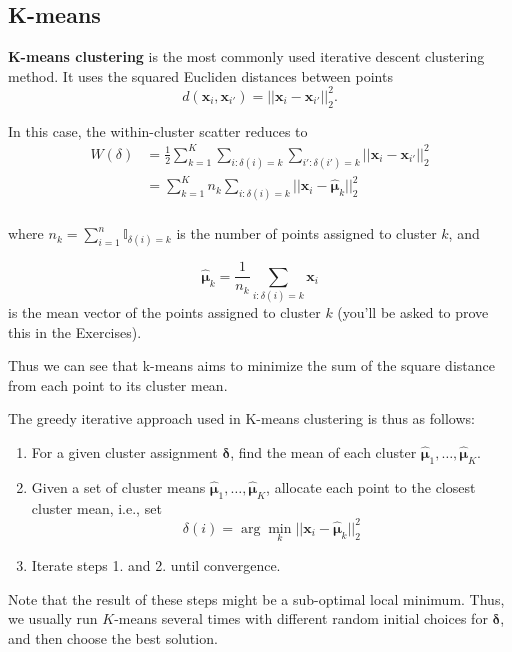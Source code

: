 \documentclass[
]{book}
\theoremstyle{definition}
\theoremstyle{definition}
\theoremstyle{definition}
\theoremstyle{definition}
\theoremstyle{remark}
\begin{document}
\subsection{K-means}\label{k-means}

\textbf{K-means clustering} is the most commonly used iterative descent clustering method. It uses the squared Eucliden distances between points
\[d(\mathbf x_i, \mathbf x_{i'})=||\mathbf x_i - \mathbf x_{i'}||_2^2.\]

In this case, the within-cluster scatter reduces to
\begin{align}
W(\delta) &= \frac{1}{2}\sum_{k=1}^K \sum_{i: \delta(i)=k} \sum_{i': \delta(i')=k} ||\mathbf x_i - \mathbf x_{i'}||_2^2 \\
&= \sum_{k=1}^K n_k \sum_{i: \delta(i)=k} ||\mathbf x_{i} - \hat{{\boldsymbol{\mu}}}_k||_2^2 \label{eq:Wscatterk}\\
\end{align}

where \(n_k = \sum_{i=1}^n \mathbb{I}_{\delta(i)=k}\) is the number of points assigned to cluster \(k\), and

\[\hat{{\boldsymbol{\mu}}}_k=\frac{1}{n_k}\sum_{i: \delta(i)=k} \mathbf x_i\]
is the mean vector of the points assigned to cluster \(k\) (you'll be asked to prove this in the Exercises).

Thus we can see that k-means aims to minimize the sum of the square distance from each point to its cluster mean.

The greedy iterative approach used in K-means clustering is thus as follows:

\begin{enumerate}
\def\labelenumi{\arabic{enumi}.}
\item
  For a given cluster assignment \(\boldsymbol \delta\), find the mean of each cluster \(\hat{{\boldsymbol{\mu}}}_1, \ldots, \hat{{\boldsymbol{\mu}}}_K\).
\item
  Given a set of cluster means \(\hat{{\boldsymbol{\mu}}}_1, \ldots, \hat{{\boldsymbol{\mu}}}_K\), allocate each point to the closest cluster mean, i.e., set
  \[\delta(i) = \arg \min_k ||\mathbf x_i - \hat{{\boldsymbol{\mu}}}_k||_2^2\]
\item
  Iterate steps 1. and 2. until convergence.
\end{enumerate}

Note that the result of these steps might be a sub-optimal local minimum. Thus, we usually run \(K\)-means several times with different random initial choices for \(\boldsymbol \delta\), and then choose the best solution.
\end{document}
